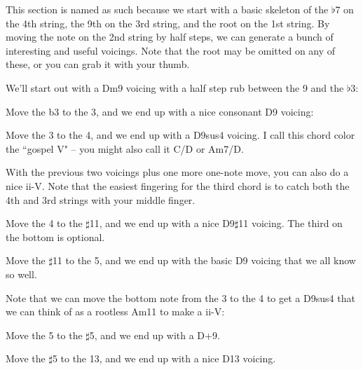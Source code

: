 This section is named as such because we start with a basic skeleton of the $\flat$7 on the 4th string, the 9th on the 3rd string, and the root on the 1st string.  By moving the note on the 2nd string by half steps, we can generate a bunch of interesting and useful voicings.  Note that the root may be omitted on any of these, or you can grab it with your thumb.

We'll start out with a Dm9 voicing with a half step rub between the 9 and the $\flat$3:


Move the b3 to the 3, and we end up with a nice consonant D9 voicing:


Move the 3 to the 4, and we end up with a D9sus4 voicing.  I call this chord color the ``gospel V" -- you might also call it C/D or Am7/D.


With the previous two voicings plus one more one-note move, you can also do a nice ii-V.  Note that the easiest fingering for the third chord is to catch both the 4th and 3rd strings with your middle finger.


Move the 4 to the $\sharp$11, and we end up with a nice D9$\sharp$11 voicing.  The third on the bottom is optional.


Move the $\sharp$11 to the 5, and we end up with the basic D9 voicing that we all know so well.


Note that we can move the bottom note from the 3 to the 4 to get a D9sus4 that we can think of as a rootless Am11 to make a ii-V:


Move the 5 to the $\sharp$5, and we end up with a D+9.


Move the $\sharp$5 to the 13, and we end up with a nice D13 voicing.


